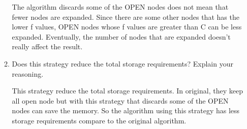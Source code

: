\documentclass[12pt]{article}
\begin{document}
\begin{enumerate}
\begin{enumerate}
  The algorithm discards some of the OPEN nodes does not mean that fewer nodes are expanded. Since there are some other nodes that has the lower f values, OPEN nodes whose f values are greater than C can be less expanded. Eventually, the number of nodes that are expanded doesn't really affect the result. 
  
  \item Does this strategy reduce the total storage requirements? Explain your reasoning. \par
  
  This strategy reduce the total storage requirements. In original, they keep all open node but with this strategy that discards some of the OPEN nodes can save the memory. So the algorithm using this strategy has less storage requirements compare to the original algorithm. 
  
  \end{enumerate}

\end{enumerate}

\newpage
\end{document}
